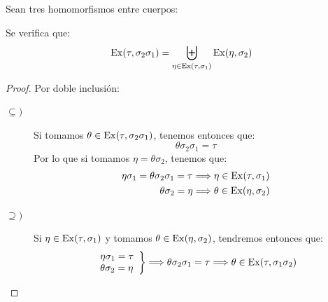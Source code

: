 \begin{lema}\label{lema:extension_compuesta}
    Sean tres homomorfismos entre cuerpos:
    \begin{figure}[H]
        \centering
    \end{figure}
    Se verifica que:
    \begin{equation*}
        \operatorname{Ex}(\tau,\sigma_2\sigma_1) = \biguplus_{\eta \in \operatorname{Ex}(\tau,\sigma_1)} \operatorname{Ex}(\eta,\sigma_2)
    \end{equation*}
    \begin{proof}
        Por doble inclusión:
        \begin{description}
            \item [$\subseteq )$] Si tomamos $\theta \in \operatorname{Ex}(\tau,\sigma_2\sigma_1)$, tenemos entonces que:
                \begin{equation*}
                    \theta\sigma_2\sigma_1 = \tau
                \end{equation*}
                Por lo que si tomamos $\eta = \theta\sigma_2$, tenemos que:
                \begin{align*}
                    \eta\sigma_1 =\theta\sigma_2\sigma_1 = \tau &\Longrightarrow \eta \in \operatorname{Ex}(\tau,\sigma_1) \\
                    \theta\sigma_2 = \eta &\Longrightarrow \theta \in \operatorname{Ex}(\eta, \sigma_2)
                \end{align*}
            \item [$\supseteq )$] Si $\eta \in \operatorname{Ex}(\tau,\sigma_1)$ y tomamos $\theta\in \operatorname{Ex}(\eta,\sigma_2)$, tendremos entonces que:
                \begin{equation*}
                    \left.\begin{array}{l}
                        \eta\sigma_1 = \tau \\
                        \theta\sigma_2 = \eta
                    \end{array}\right\}\Longrightarrow \theta\sigma_2\sigma_1 = \tau \Longrightarrow \theta\in \operatorname{Ex}(\tau,\sigma_1\sigma_2)
                \end{equation*}
        \end{description}
        \begin{figure}[ht]

\end{figure}
\end{proof}
\end{lema}

